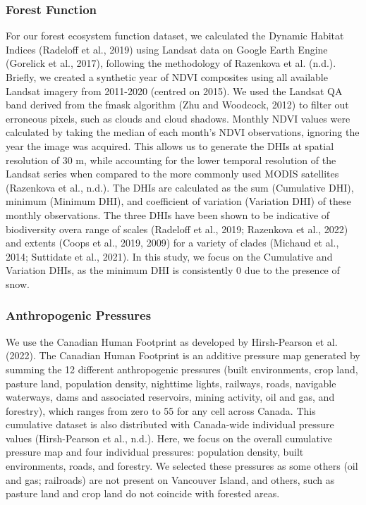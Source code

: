 \documentclass[
]{agujournal2019}
\begin{document}
\subsubsection{Forest Function}\label{forest-function}

For our forest ecosystem function dataset, we calculated the Dynamic
Habitat Indices (Radeloff et al., 2019) using Landsat data on Google
Earth Engine (Gorelick et al., 2017), following the methodology of
Razenkova et al. (n.d.). Briefly, we created a synthetic year of NDVI
composites using all available Landsat imagery from 2011-2020 (centred
on 2015). We used the Landsat QA band derived from the fmask algorithm
(Zhu and Woodcock, 2012) to filter out erroneous pixels, such as clouds
and cloud shadows. Monthly NDVI values were calculated by taking the
median of each month's NDVI observations, ignoring the year the image
was acquired. This allows us to generate the DHIs at spatial resolution
of 30 m, while accounting for the lower temporal resolution of the
Landsat series when compared to the more commonly used MODIS satellites
(Razenkova et al., n.d.). The DHIs are calculated as the sum (Cumulative
DHI), minimum (Minimum DHI), and coefficient of variation (Variation
DHI) of these monthly observations. The three DHIs have been shown to be
indicative of biodiversity overa range of scales (Radeloff et al., 2019;
Razenkova et al., 2022) and extents (Coops et al., 2019, 2009) for a
variety of clades (Michaud et al., 2014; Suttidate et al., 2021). In
this study, we focus on the Cumulative and Variation DHIs, as the
minimum DHI is consistently 0 due to the presence of snow.

\subsubsection{Anthropogenic Pressures}\label{anthropogenic-pressures}

We use the Canadian Human Footprint as developed by Hirsh-Pearson et al.
(2022). The Canadian Human Footprint is an additive pressure map
generated by summing the 12 different anthropogenic pressures (built
environments, crop land, pasture land, population density, nighttime
lights, railways, roads, navigable waterways, dams and associated
reservoirs, mining activity, oil and gas, and forestry), which ranges
from zero to 55 for any cell across Canada. This cumulative dataset is
also distributed with Canada-wide individual pressure values
(Hirsh-Pearson et al., n.d.). Here, we focus on the overall cumulative
pressure map and four individual pressures: population density, built
environments, roads, and forestry. We selected these pressures as some
others (oil and gas; railroads) are not present on Vancouver Island, and
others, such as pasture land and crop land do not coincide with forested
areas.
\end{document}
